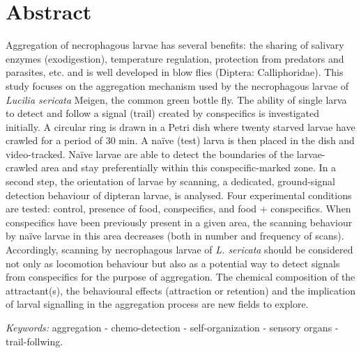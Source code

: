 \section{Abstract}
Aggregation of necrophagous larvae has several benefits: the sharing of salivary enzymes (exodigestion), temperature regulation, protection from predators and parasites, etc. and is well developed in blow flies (Diptera: Calliphoridae). This study focuses on the aggregation mechanism used by the necrophagous larvae of \textit{Lucilia sericata} Meigen, the common green bottle fly. The ability of single larva to detect and follow a signal (trail) created by conspecifics is investigated initially. A circular ring is drawn in a Petri dish where twenty starved larvae have crawled for a period of 30 min. A naïve (test) larva is then placed in the dish and video-tracked. Naïve larvae are able to detect the boundaries of the larvae-crawled area and stay preferentially within this conspecific-marked zone. In a second step, the orientation of larvae by scanning, a dedicated, ground-signal detection behaviour of dipteran larvae, is analysed. Four experimental conditions are tested: control, presence of food, conspecifics, and food + conspecifics. When conspecifics have been previously present in a given area, the scanning behaviour by naïve larvae in this area decreases (both in number and frequency of scans). Accordingly, scanning by necrophagous larvae of \textit{L. sericata} should be considered not only as locomotion behaviour but also as a potential way to detect signals from conspecifics for the purpose of aggregation. The chemical composition of the attractant(s), the behavioural effects (attraction or retention) and the implication of larval signalling in the aggregation process are new fields to explore.

\emph{Keywords:} aggregation - chemo-detection - self-organization - sensory organs - trail-follwing.

\clearpage

